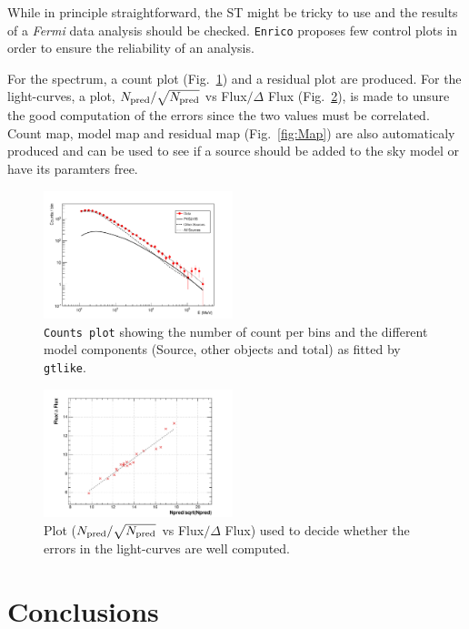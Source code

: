 \documentclass[a4paper]{article}
\newcommand{\Fermi}{\textit{Fermi} }
\begin{document}
While in principle straightforward, the ST might be tricky to use and the
results of a \Fermi data analysis should be checked. {\tt Enrico} proposes few
control plots in order to ensure the reliability of an analysis. 

For the spectrum, a count plot (Fig.~\ref{fig:control1}) and a residual plot are
produced. For the light-curves, a plot, $N_{\rm pred}/\sqrt{N_{\rm pred}}$ vs
Flux$/\Delta$ Flux (Fig.~\ref{fig:control2}), is made to unsure the good
computation of the errors since the two values must be correlated. Count map,
model map and residual map (Fig.~\ref{fig:Map}) are also automaticaly produced
and can be used to see if a source should be added to the sky model or have its
paramters free.


 \begin{figure}[t]
  \includegraphics[width=0.49\textwidth]{icrc2013_89_04}
  \caption{{\tt Counts plot} showing the number of count per bins and the different model components (Source, other objects and total) as fitted by {\tt gtlike}.}
\label{fig:control1}
 \end{figure}

 \begin{figure}[t]
  \includegraphics[width=0.49\textwidth]{icrc2013_89_05}
  \caption{Plot ($N_{\rm pred}/\sqrt{N_{\rm pred}}$ vs Flux$/\Delta$ Flux) used to decide whether the errors in the light-curves are well computed.}
\label{fig:control2}
 \end{figure}

\section{Conclusions}
\end{document}
